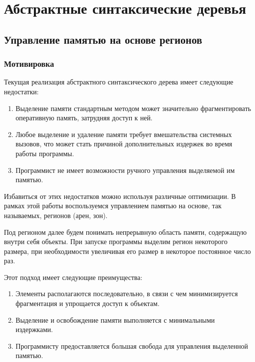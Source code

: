 \documentclass[bachelor, och, coursework]{SCWorks}
\begin{document}
\section{Абстрактные синтаксические деревья}
    \subsection{Управление памятью на основе регионов}
    \subsubsection{Мотивировка}
    
    Текущая реализация абстрактного синтаксического дерева имеет следующие недостатки:
    \begin{enumerate}
    \item Выделение памяти стандартным методом может значительно фрагментировать оперативную память, 
    затрудняя доступ к ней.
    \item Любое выделение и удаление памяти требует вмешательства системных
    вызовов, что может стать причиной дополнительных издержек во время
    работы программы.
    \item Программист не имеет возможности ручного управления выделяемой им
    памятью.
    \end{enumerate}

    Избавиться от этих недостатков можно используя различные оптимизации. В рамках этой работы 
    воспользуемся управлением памятью на основе, так называемых, регионов (арен, зон)\cite{Wang}.

    Под регионом далее будем понимать непрерывную область памяти, содержащую внутри себя объекты. 
    При запуске программы выделим регион некоторого размера, при необходимости увеличивая его 
    размер в некоторое постоянное число раз.

    Этот подход имеет следующие преимущества:
    \begin{enumerate}
        \item Элементы располагаются последовательно, в связи с чем минимизируется
        фрагментация и упрощается доступ к объектам.
        \item Выделение и освобождение памяти выполняется с минимальными издержками.
        \item Программисту предоставляется большая свобода для управления выделенной памятью.
    \end{enumerate}
\end{document}
